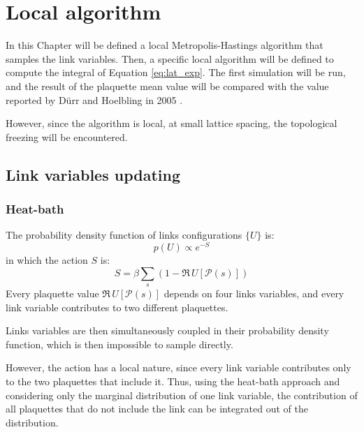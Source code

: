 \chapter{Local algorithm}\label{ch:local}

In this Chapter will be defined a local Metropolis-Hastings algorithm that samples the link variables.
Then, a specific local algorithm will be defined to compute the integral of Equation \eqref{eq:lat_exp}.
The first simulation will be run,
and the result of the plaquette mean value will be compared with the value reported by D\"urr and Hoelbling in 2005 \cite{durr-hoelbling:2005}.

However, since the algorithm is local, at small lattice spacing, the topological freezing will be encountered.

\section{Link variables updating}
\subsection*{Heat-bath}
The probability density function of links configurations $\{U\}$ is:
\[
    p(U) \propto e^{-S}
\]
in which the action $S$ is:
\[
    S = \beta\sum_s\left(1-\Re\,U[\mathcal P(s)]\right)
\]
Every plaquette value $\Re\,U[\mathcal P(s)]$ depends on four links variables,
and every link variable contributes to two different plaquettes.

Links variables are then simultaneously coupled in their probability density function,
which is then impossible to sample directly.

However, the action has a local nature,
since every link variable contributes only to the two plaquettes that include it.
Thus, using the heat-bath approach and considering only the marginal distribution of one link variable,
the contribution of all plaquettes that do not include the link can be integrated out of the distribution.

